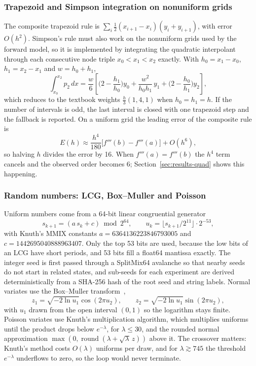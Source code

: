 \documentclass[sigconf,nonacm]{acmart}
\begin{document}
\subsubsection{Trapezoid and Simpson integration on nonuniform grids}
The composite trapezoid rule is $\sum_i \tfrac12(x_{i+1}-x_i)(y_i+y_{i+1})$, with error $O(h^2)$. Simpson's rule must also work on the nonuniform grids used by the forward model, so it is implemented by integrating the quadratic interpolant through each consecutive node triple $x_0<x_1<x_2$ exactly. With $h_0=x_1-x_0$, $h_1=x_2-x_1$ and $w=h_0+h_1$,
\begin{equation}
\int_{x_0}^{x_2}p_2\,dx=\frac{w}{6}\left[\Big(2-\frac{h_1}{h_0}\Big)y_0+\frac{w^2}{h_0h_1}\,y_1+\Big(2-\frac{h_0}{h_1}\Big)y_2\right],
\label{eq:simpson}
\end{equation}
which reduces to the textbook weights $\tfrac{h}{3}(1,4,1)$ when $h_0=h_1=h$. If the number of intervals is odd, the last interval is closed with one trapezoid step and the fallback is reported. On a uniform grid the leading error of the composite rule is
\begin{equation}
E(h)\approx\frac{h^4}{180}\big[f'''(b)-f'''(a)\big]+O(h^6),
\label{eq:simpsonerror}
\end{equation}
so halving $h$ divides the error by 16. When $f'''(a)=f'''(b)$ the $h^4$ term cancels and the observed order becomes 6; Section~\ref{sec:results-quad} shows this happening.

\subsubsection{Random numbers: LCG, Box--Muller and Poisson}
Uniform numbers come from a 64-bit linear congruential generator~\cite{knuth1997}
\begin{equation}
s_{k+1}=(a\,s_k+c)\bmod 2^{64},\qquad u_k=\lfloor s_{k+1}/2^{11}\rfloor\cdot2^{-53},
\label{eq:lcg}
\end{equation}
with Knuth's MMIX constants $a=6364136223846793005$ and $c=1442695040888963407$. Only the top 53 bits are used, because the low bits of an LCG have short periods, and 53 bits fill a float64 mantissa exactly. The integer seed is first passed through a SplitMix64 avalanche so that nearby seeds do not start in related states, and sub-seeds for each experiment are derived deterministically from a SHA-256 hash of the root seed and string labels. Normal variates use the Box--Muller transform~\cite{box1958},
\begin{equation}
z_1=\sqrt{-2\ln u_1}\cos(2\pi u_2),\qquad z_2=\sqrt{-2\ln u_1}\sin(2\pi u_2),
\label{eq:boxmuller}
\end{equation}
with $u_1$ drawn from the open interval $(0,1)$ so the logarithm stays finite. Poisson variates use Knuth's multiplication algorithm, which multiplies uniforms until the product drops below $e^{-\lambda}$, for $\lambda\le30$, and the rounded normal approximation $\max(0,\operatorname{round}(\lambda+\sqrt{\lambda}\,z))$ above it. The crossover matters: Knuth's method costs $O(\lambda)$ uniforms per draw, and for $\lambda\gtrsim745$ the threshold $e^{-\lambda}$ underflows to zero, so the loop would never terminate.
\end{document}
